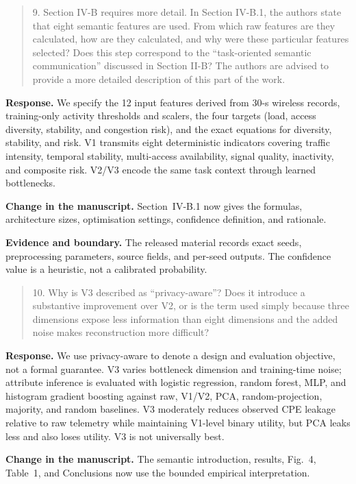 \documentclass[11pt]{article}
\newenvironment{reviewercomment}{\begin{quote}\color{reviewblue}}{\end{quote}}
\newenvironment{authorresponse}{\color{responsegreen}\textbf{Response.} }{\par\color{black}}
\newcommand{\change}[1]{\par\textbf{Change in the manuscript.} #1\par}
\newcommand{\evidence}[1]{\par\textbf{Evidence and boundary.} #1\par}
\begin{document}
\begin{reviewercomment}
9. Section IV-B requires more detail. In Section IV-B.1, the authors state that eight semantic features are used. From which raw features are they calculated, how are they calculated, and why were these particular features selected? Does this step correspond to the ``task-oriented semantic communication'' discussed in Section II-B? The authors are advised to provide a more detailed description of this part of the work.
\end{reviewercomment}
\begin{authorresponse}
We specify the 12 input features derived from 30-s wireless records, training-only activity thresholds and scalers, the four targets (load, access diversity, stability, and congestion risk), and the exact equations for diversity, stability, and risk. V1 transmits eight deterministic indicators covering traffic intensity, temporal stability, multi-access availability, signal quality, inactivity, and composite risk. V2/V3 encode the same task context through learned bottlenecks.
\end{authorresponse}
\change{Section~IV-B.1 now gives the formulas, architecture sizes, optimisation settings, confidence definition, and rationale.}
\evidence{The released material records exact seeds, preprocessing parameters, source fields, and per-seed outputs. The confidence value is a heuristic, not a calibrated probability.}

\begin{reviewercomment}
10. Why is V3 described as ``privacy-aware''? Does it introduce a substantive improvement over V2, or is the term used simply because three dimensions expose less information than eight dimensions and the added noise makes reconstruction more difficult?
\end{reviewercomment}
\begin{authorresponse}
We use privacy-aware to denote a design and evaluation objective, not a formal guarantee. V3 varies bottleneck dimension and training-time noise; attribute inference is evaluated with logistic regression, random forest, MLP, and histogram gradient boosting against raw, V1/V2, PCA, random-projection, majority, and random baselines. V3 moderately reduces observed CPE leakage relative to raw telemetry while maintaining V1-level binary utility, but PCA leaks less and also loses utility. V3 is not universally best.
\end{authorresponse}
\change{The semantic introduction, results, Fig.~4, Table~1, and Conclusions now use the bounded empirical interpretation.}
\end{document}
